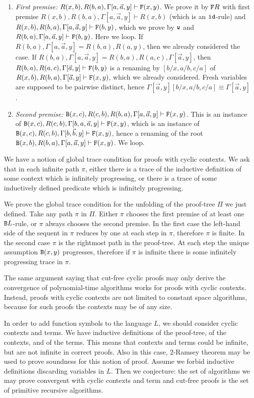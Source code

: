 \documentclass[a4paper,12pt]{article}
\newcommand{\Backward}         { {\tt B} }
\newcommand{\Forward}         { {\tt F} }
\newcommand{\id}              { {\tt id} }
\newcommand{\Weak} { {\tt w} }
\begin{document}
\begin{enumerate}
\item
\emph{First premise:}
$R(x,b), R(b,a), \Gamma[a,\vec{a},y] \vdash \Forward(x,y)$. We prove it by $\Forward R$ with first premise $R(x,b), R(b,a), \Gamma[a,\vec{a},y] \vdash R(x,b)$ (which is an $\id$-rule) and $R(x,b), R(b,a), \Gamma[a,\vec{a},y] \vdash \Forward(b,y)$, which we prove by $\Weak$ and $R(b,a), \Gamma[a,\vec{a},y] \vdash \Forward(b,y)$. Here we loop. If $R(b,a), \Gamma[a,\vec{a},y] = R(b,a), R(a,y)$, then we already considered the case. If $R(b,a), \Gamma[a,\vec{a},y] = R(b,a), R(a,c), \Gamma[\vec{a},y]$, then $R(b,a), R(a,c), \Gamma[\vec{a},y] \vdash \Forward(b,y)$ is a renaming by $[b/x,a/b,c/a]$ of $R(x,b), R(b,a), \Gamma[\vec{a},y] \vdash \Forward(x,y)$, which we already considered.  Fresh variables are supposed to be pairwise distinct, hence  $\Gamma[\vec{a},y][b/x,a/b,c/a] \equiv \Gamma[\vec{a},y]$.
\item
\emph{Second premise:} $\Backward(x,c), R(c,b), R(b,a), \Gamma[a,\vec{a},y] \vdash \Forward(x,y)$. This is an instance  of $\Backward(x,c), R(c,b), \Gamma[b,a,\vec{a},y] \vdash \Forward(x,y)$, which is an instance of $\Backward(x,c), R(c,b), \Gamma[b,\vec{b},y] \vdash \Forward(x,y)$, hence a renaming of the root $\Backward(x,b), R(b,a), \Gamma[a,\vec{a},y]\vdash \Forward(x,y)$. We loop.
\end{enumerate}

We have a notion of global trace condition for proofs with cyclic contexts. We ask that in each infinite path $\pi$, either there is a trace of the inductive definition of some context which is infinitely progressing, or there is a trace of some inductively defined predicate which is infinitely progressing.

We prove the global trace condition for the unfolding of the proof-tree $\Pi$ we just defined. Take any path $\pi$ in $\Pi$. Either $\pi$ chooses the first premise of at least one $\Backward L$-rule, or $\pi$ always chooses the second premise. In the first case the left-hand side of the sequent in $\pi$ reduces by one at each step in $\pi$, therefore $\pi$ is finite. In the second case $\pi$ is the rightmost path in the proof-tree. At each step the unique assumption $\Backward(x,y)$ progresses, therefore if $\pi$ is infinite there is some infinitely progressing trace in $\pi$. 

The same argument saying that cut-free cyclic proofs may only derive the convergence of polynomial-time algorithms works for proofs with cyclic contexts. Instead, proofs with cyclic contexts are not limited to constant space algorithms, because for such proofs the contexts may be of any size. 

In order to add function symbols to the language $L$, we should consider cyclic contexts and terms. We have inductive definitions of the proof-tree, of the contexts, and of the terms. This means that contexts and terms could be infinite, but are not infinite in correct proofs. Also in this case, $2$-Ramsey theorem may be used to prove soundness for this notion of proof. Assume we forbid inductive definitions discarding variables in $L$. Then we conjecture: the set of algorithms we may prove convergent with cyclic contexts and term and cut-free proofs is the set of primitive recursive algorithms.
\end{document}
